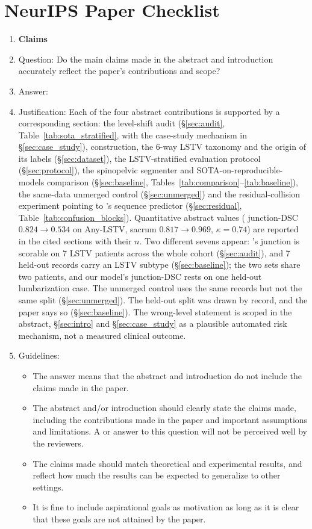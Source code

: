\section*{NeurIPS Paper Checklist}

\begin{enumerate}

\item {\bf Claims}
    \item[] Question: Do the main claims made in the abstract and introduction accurately reflect the paper's contributions and scope?
    \item[] Answer: \answerYes{}
    \item[] Justification: Each of the four abstract contributions is supported by a corresponding section: the \sota{} level-shift audit (\S\ref{sec:audit}, Table~\ref{tab:sota_stratified}, with the case-study mechanism in \S\ref{sec:case_study}), \dataset{} construction, the 6-way LSTV taxonomy and the origin of its labels (\S\ref{sec:dataset}), the LSTV-stratified evaluation protocol (\S\ref{sec:protocol}), the spinopelvic segmenter and SOTA-on-reproducible-models comparison (\S\ref{sec:baseline}, Tables~\ref{tab:comparison}--\ref{tab:baseline}), the same-data unmerged control (\S\ref{sec:unmerged}) and the residual-collision experiment pointing to \VERIDAH{}'s sequence predictor (\S\ref{sec:residual}, Table~\ref{tab:confusion_blocks}). Quantitative abstract values (\sota{} junction-DSC $0.824\to0.534$ on Any-LSTV, sacrum $0.817\to0.969$, $\kappa{=}0.74$) are reported in the cited sections with their $n$. Two different sevens appear: \sota{}'s junction is scorable on 7 LSTV patients across the whole cohort (\S\ref{sec:audit}), and 7 held-out records carry an LSTV subtype (\S\ref{sec:baseline}); the two sets share two patients, and our model's junction-DSC rests on one held-out lumbarization case. The unmerged control uses the same records but not the same split (\S\ref{sec:unmerged}). The held-out split was drawn by record, and the paper says so (\S\ref{sec:baseline}). The wrong-level statement is scoped in the abstract, \S\ref{sec:intro} and \S\ref{sec:case_study} as a plausible automated risk mechanism, not a measured clinical outcome.
    \item[] Guidelines:
    \begin{itemize}
        \item The answer \answerNA{} means that the abstract and introduction do not include the claims made in the paper.
        \item The abstract and/or introduction should clearly state the claims made, including the contributions made in the paper and important assumptions and limitations. A \answerNo{} or \answerNA{} answer to this question will not be perceived well by the reviewers.
        \item The claims made should match theoretical and experimental results, and reflect how much the results can be expected to generalize to other settings.
        \item It is fine to include aspirational goals as motivation as long as it is clear that these goals are not attained by the paper.
    \end{itemize}


\end{enumerate}
